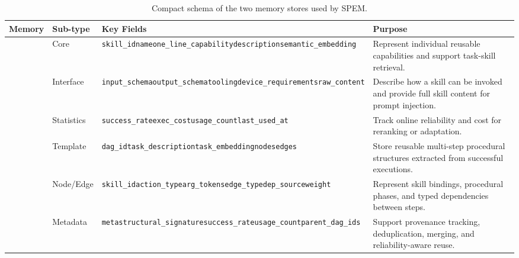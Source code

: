 \documentclass[letterpaper]{article}
\newcommand{\model}{\textsc{SPEM}}
\begin{document}
\begin{table}[t]
\centering
\small
\begin{tabularx}{\textwidth}{>{\centering\arraybackslash}p{} p{} p{} X}
\toprule
Memory & Sub-type & Key Fields & Purpose \\
\midrule
\multirow{Atomic Skill} & Core & \texttt{skill\_id}\newline\texttt{name}\newline\texttt{one\_line\_capability}\newline\texttt{description}\newline\texttt{semantic\_embedding} & Represent individual reusable capabilities and support task-skill retrieval. \\
\cmidrule{2-4}
 & Interface & \texttt{input\_schema}\newline\texttt{output\_schema}\newline\texttt{tooling}\newline\texttt{device\_requirements}\newline\texttt{raw\_content} & Describe how a skill can be invoked and provide full skill content for prompt injection. \\
\cmidrule{2-4}
 & Statistics & \texttt{success\_rate}\newline\texttt{exec\_cost}\newline\texttt{usage\_count}\newline\texttt{last\_used\_at} & Track online reliability and cost for reranking or adaptation. \\
\midrule
\multirow{DAG} & Template & \texttt{dag\_id}\newline\texttt{task\_description}\newline\texttt{task\_embedding}\newline\texttt{nodes}\newline\texttt{edges} & Store reusable multi-step procedural structures extracted from successful executions. \\
\cmidrule{2-4}
 & Node/Edge & \texttt{skill\_id}\newline\texttt{action\_type}\newline\texttt{arg\_tokens}\newline\texttt{edge\_type}\newline\texttt{dep\_source}\newline\texttt{weight} & Represent skill bindings, procedural phases, and typed dependencies between steps. \\
\cmidrule{2-4}
 & Metadata & \texttt{meta}\newline\texttt{structural\_signature}\newline\texttt{success\_rate}\newline\texttt{usage\_count}\newline\texttt{parent\_dag\_ids} & Support provenance tracking, deduplication, merging, and reliability-aware reuse. \\
\bottomrule
\end{tabularx}
\caption{Compact schema of the two memory stores used by \model{}.}
\label{tab:memory-schema}
\end{table}
\end{document}
